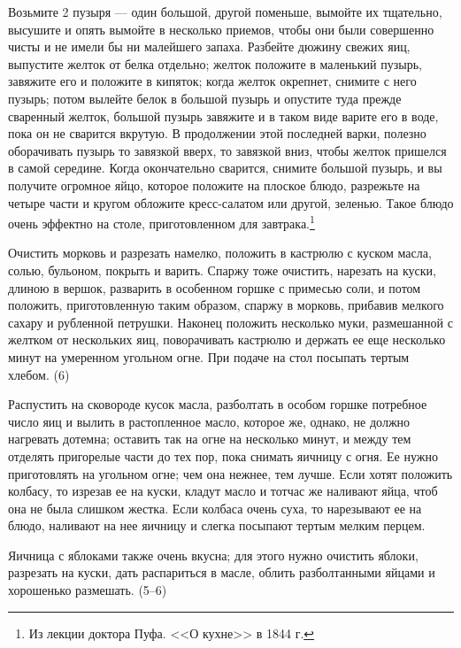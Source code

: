 
Возьмите 2 пузыря — один большой, другой поменьше, вымойте их тщательно, высушите и опять вымойте в несколько приемов, чтобы они были совершенно чисты и не имели бы ни малейшего запаха. Разбейте дюжину свежих яиц, выпустите желток от белка отдельно; желток положите в маленький пузырь, завяжите его и положите в кипяток; когда желток окрепнет, снимите с него пузырь; потом вылейте белок в большой пузырь и опустите туда прежде сваренный желток, большой пузырь завяжите и в таком виде варите его в воде, пока он не сварится вкрутую. В продолжении этой последней варки, полезно оборачивать пузырь то завязкой вверх, то завязкой вниз, чтобы желток пришелся в самой середине. Когда окончательно сварится, снимите большой пузырь, и вы получите огромное яйцо, которое положите на плоское блюдо, разрежьте на четыре части и кругом обложите кресс-салатом или другой, зеленью. Такое блюдо очень эффектно на столе, приготовленном для завтрака.\footnote{Из лекции доктора Пуфа. <<О кухне>> в 1844 г.}


Очистить морковь и разрезать намелко, положить в кастрюлю с куском масла, солью, бульоном, покрыть и варить. Спаржу тоже очистить, нарезать на куски, длиною в вершок, разварить в особенном горшке с примесью соли, и потом положить, приготовленную таким образом, спаржу в морковь, прибавив мелкого сахару и рубленной петрушки. Наконец положить несколько муки, размешанной с желтком от нескольких яиц, поворачивать кастрюлю и держать ее еще несколько минут на умеренном угольном огне. При подаче на стол посыпать тертым хлебом. (6) 


Распустить на сковороде кусок масла, разболтать в особом горшке потребное число яиц и вылить в растопленное масло, которое же, однако, не должно нагревать дотемна; оставить так на огне на несколько минут, и между тем отделять пригорелые части до тех пор, пока снимать яичницу с огня. Ее нужно приготовлять на угольном огне; чем она нежнее, тем лучше. Если хотят положить колбасу, то изрезав ее на куски, кладут масло и тотчас же наливают яйца, чтоб она не была слишком жестка. Если колбаса очень суха, то нарезывают ее на блюдо, наливают на нее яичницу и слегка посыпают тертым мелким перцем.

Яичница с яблоками также очень вкусна; для этого нужно очистить яблоки, разрезать на куски, дать распариться в масле, облить разболтанными яйцами и хорошенько размешать. (5--6)

